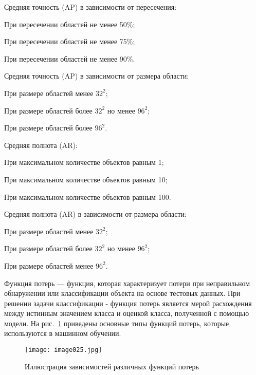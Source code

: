 %
\begin{itemize*}
  \item Средняя точность (AP) в зависимости от пересечения:
	\begin{itemize*}
	  \item При пересечении областей не менее 50\%;
	  \item При пересечении областей не менее 75\%;
	  \item При пересечении областей не менее 90\%.
	\end{itemize*}
  \item Средняя точность (AP) в зависимости от размера области:
	\begin{itemize*}
	  \item При размере областей менее \(32^2\);
	  \item При размере областей более \(32^2\) но менее \(96^2\);
	  \item При размере областей более \(96^2\).
	\end{itemize*}
  \item Средняя полнота (AR):
	\begin{itemize*}
	  \item При максимальном количестве объектов равным 1;
	  \item При максимальном количестве объектов равным 10;
	  \item При максимальном количестве объектов равным 100.
	\end{itemize*}
  \item Средняя полнота (AR) в зависимости от размера области:
	\begin{itemize*}
	  \item При размере областей менее \(32^2\);
	  \item При размере областей более \(32^2\) но менее \(96^2\);
	  \item При размере областей менее \(96^2\).
	\end{itemize*}
\end{itemize*}
%

Функция потерь — функция, которая характеризует потери при неправильном обнаружении или классификации объекта на основе тестовых данных. При решении задачи классификации - функция потерь является мерой расхождения между истинным значением класса и оценкой класса, полученной с помощью модели.
На рис.~\ref{fig:lossfunctions}  приведены основные типы функций потерь, которые используются в машинном обучении.

\begin{figure}[htbp]
\centering
\texttt{[image: image025.jpg]}
\caption{Иллюстрация зависимостей различных функций потерь\cite{twentyone}}%
\label{fig:lossfunctions}
\end{figure}


